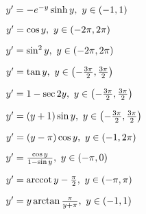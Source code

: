 \begin{multicols}{2}
\begin{enumtasks}
			\label{stability_zeros:geometrical_part2}
			\item \( y' = -e^{-y} \sinh{y}, ~ y \in \left( -1, 1 \right) \) %
			\item \( y' = \cos{y}, ~ y \in \left( -2\pi, 2\pi \right) \) %
			\item \( y' = \sin^2{y}, ~ y \in \left( -2\pi, 2\pi \right) \) %
			\item \( y' = \tan{y}, ~ y \in \left( -\frac{3\pi}{2}, \frac{3\pi}{2} \right) \) %
			\item \( y' = 1 - \sec{2y}, ~ y \in \left( -\frac{3\pi}{2}, \frac{3\pi}{2} \right) \) %
			\item \( y' = \left( y + 1 \right) \sin{y}, ~ y \in \left( -\frac{3\pi}{2}, \frac{3\pi}{2} \right) \) %
			\item \( y' = \left( y - \pi \right) \cos{y}, ~ y \in \left( -1, 2\pi \right) \) %
			\item \( y' = \frac{\cos{y}}{1 - \sin{y}}, ~ y \in \left( -\pi, 0 \right) \) %
			\item \( y' = \operatorname{arccot}{y} - \frac{\pi}{2}, ~ y \in \left( -\pi, \pi \right) \) %
			\item \( y' = y\arctan{\frac{\pi}{y + \pi}}, ~ y \in \left( -1, 1 \right) \) %

		\end{enumtasks}
	\end{multicols}


